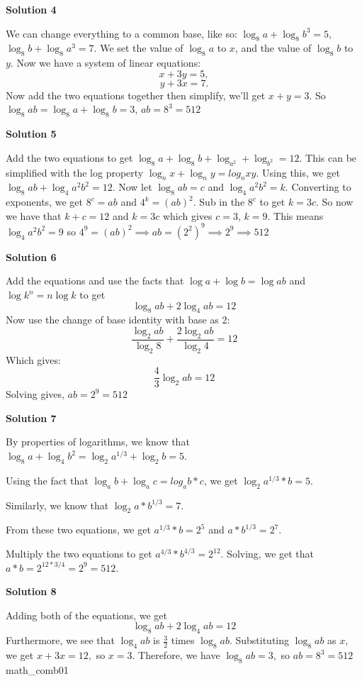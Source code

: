 \begin{enumerate}
\textbf{Solution 4}

We can change everything to a common base, like so: $\log_8{a} + \log_8{b^3} = 5,$ $\log_8{b} + \log_8{a^3} = 7.$ We set the value of $\log_8{a}$ to $x$, and the value of $\log_8{b}$ to $y.$ Now we have a system of linear equations: 
 \[x + 3y = 5,\] 
 \[y + 3x = 7.\] Now add the two equations together then simplify, we'll get $x+y=3$. So $\log_8{ab} = \log_8{a} + \log_8{b} = 3$, $ab = 8^3 = \boxed{512}$




\textbf{Solution 5}

Add the two equations to get $\log_8 {a}+ \log_8 {b}+ \log_{a^2}+\log_{b^2}=12$. This can be simplified with the log property $\log_n {x}+\log_n {y}=log_n {xy}$. Using this, we get $\log_8 {ab}+ \log_4 {a^2b^2}=12$. Now let $\log_8 {ab}=c$ and $\log_4 {a^2b^2}=k$. Converting to exponents, we get $8^c=ab$ and $4^k=(ab)^2$. Sub in the $8^c$ to get $k=3c$. So now we have that $k+c=12$ and $k=3c$ which gives $c=3$, $k=9$. This means $\log_4 {a^2b^2}=9$ so $4^9=(ab)^2 \implies ab=(2^2)^9 \implies 2^9 \implies \boxed {512}$




\textbf{Solution 6}

Add the equations and use the facts that $\log{a} +\log{b}=\log{ab}$ and $\log{k^n} =n\log{k}$ to get
 \[\log_8{ab} +2\log_4{ab}=12\]Now use the change of base identity with base as 2:
 \[\dfrac{\log_2{ab}}{\log_2{8}}+\dfrac{2\log_2{ab}}{\log_2{4}}=12\]Which gives:
 \[\frac{4}{3}\log_2{ab}=12\]Solving gives, $\boxed{ab=2^9=512}$




\textbf{Solution 7}

By properties of logarithms, we know that $\log_8 {a}+ \log_4 {b ^ 2} = \log_2 {a ^ {1/3}}+ \log_2 {b} = 5$. 

 Using the fact that $\log_a {b}  + \log_a {c}  = log_a{b*c}$, we get $\log_2 {a^{1/3} * b} = 5$. 

 Similarly, we know that $\log_2 {a * b^{1/3}} = 7$. 

 From these two equations, we get $a^{1/3} * b = 2^5$ and $a * b^{1/3} = 2^7$. 

 Multiply the two equations to get $a^{4/3} * b^{4/3} = 2^{12}$. Solving, we get that $a*b = 2^{12*3/4} = 2^9 =$$\boxed{512}$.

 



\textbf{Solution 8}

Adding both of the equations, we get 
 \[\log_8{ab} +2\log_4{ab}=12\]Furthermore, we see that $\log_4 {ab}$ is $\frac{3}{2}$ times $\log_8 {ab}.$ Substituting $\log_8 {ab}$ as $x,$ we get $x+3x=12,$ so $x=3.$ Therefore, we have $\log_8 {ab} = 3,$ so $ab= 8^3=\boxed{512}$ ~ math\_comb01


\end{enumerate}
